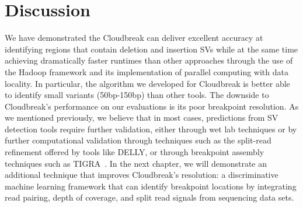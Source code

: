 \section{Discussion}

We have demonstrated the Cloudbreak can deliver excellent accuracy at identifying regions that contain deletion and insertion SVs while at the same time achieving dramatically faster runtimes than other approaches through the use of the Hadoop framework and its implementation of parallel computing with data locality. In particular, the algorithm we developed for Cloudbreak is better able to identify small variants (50bp-150bp) than other tools. The downside to Cloudbreak's performance on our evaluations is its poor breakpoint resolution. As we mentioned previously, we believe that in most cases, predictions from SV detection tools require further validation, either through wet lab techniques or by further computational validation through techniques such as the split-read refinement offered by tools like DELLY, or through breakpoint assembly techniques such as TIGRA~\cite{Chen:2013gf}. In the next chapter, we will demonstrate an additional technique that improves Cloudbreak's resolution: a discriminative machine learning framework that can identify breakpoint locations by integrating read pairing, depth of coverage, and split read signals from sequencing data sets.